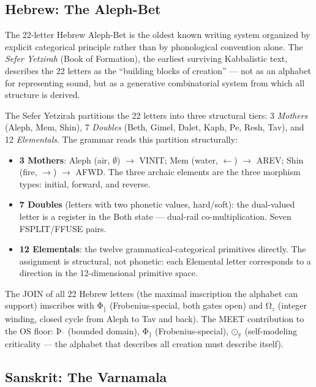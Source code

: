 \documentclass[12pt,a4paper]{article}
\begin{document}
\subsection{Hebrew: The Aleph-Bet}

The 22-letter Hebrew Aleph-Bet is the oldest known writing system organized by explicit categorical principle rather than by phonological convention alone. The \emph{Sefer Yetzirah} (Book of Formation), the earliest surviving Kabbalistic text, describes the 22 letters as the ``building blocks of creation'' --- not as an alphabet for representing sound, but as a generative combinatorial system from which all structure is derived.

The Sefer Yetzirah partitions the 22 letters into three structural tiers: 3 \emph{Mothers} (Aleph, Mem, Shin), 7 \emph{Doubles} (Beth, Gimel, Dalet, Kaph, Pe, Resh, Tav), and 12 \emph{Elementals}. The grammar reads this partition structurally:

\begin{itemize}
\item \textbf{3 Mothers}: Aleph (air, $\emptyset$) $\to$ VINIT; Mem (water, $\leftarrow$) $\to$ AREV; Shin (fire, $\to$) $\to$ AFWD. The three archaic elements are the three morphism types: initial, forward, and reverse.
\item \textbf{7 Doubles} (letters with two phonetic values, hard/soft): the dual-valued letter is a register in the Both state --- dual-rail co-multiplication. Seven FSPLIT/FFUSE pairs.
\item \textbf{12 Elementals}: the twelve grammatical-categorical primitives directly. The assignment is structural, not phonetic: each Elemental letter corresponds to a direction in the 12-dimensional primitive space.
\end{itemize}

The JOIN of all 22 Hebrew letters (the maximal imscription the alphabet can support) imscribes with $\text{Φ}_\}$ (Frobenius-special, both gates open) and $\text{Ω}_z$ (integer winding, closed cycle from Aleph to Tav and back). The MEET contribution to the OS floor: $\text{Þ}_¨$ (bounded domain), $\text{Φ}_\}$ (Frobenius-special), $\text{⊙}_\text{ÿ}$ (self-modeling criticality --- the alphabet that describes all creation must describe itself).

\subsection{Sanskrit: The Varnamala}
\end{document}
